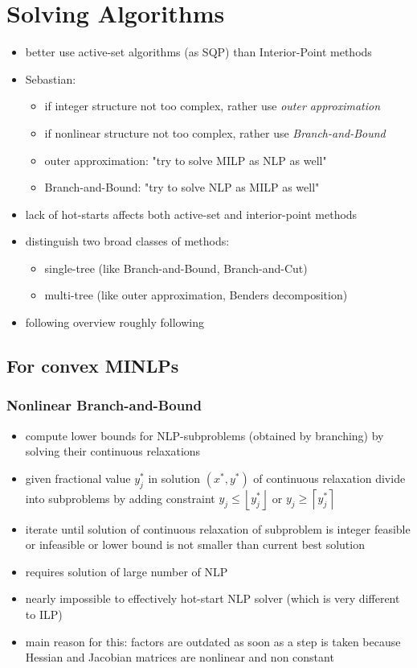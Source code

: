 \documentclass{article}
\begin{document}
\section{Solving Algorithms}
\begin{itemize}
\item better use active-set algorithms (as SQP) than Interior-Point methods
\item Sebastian: 
\begin{itemize}
\item if integer structure not too complex, rather use \textit{outer approximation}
\item if nonlinear structure not too complex, rather use \textit{Branch-and-Bound}
\item outer approximation: "try to solve MILP as NLP as well"
\item Branch-and-Bound: "try to solve NLP as MILP as well"
\end{itemize}
\item lack of hot-starts affects both active-set and interior-point methods
\item distinguish two broad classes of methods: 
\begin{itemize}
\item single-tree (like Branch-and-Bound, Branch-and-Cut) 
\item multi-tree (like outer approximation, Benders decomposition)
\end{itemize}
\item following overview roughly following \cite{d2013mixed}
\end{itemize}

\subsection{For convex MINLPs}
\subsubsection{Nonlinear Branch-and-Bound}
\begin{itemize}
\item compute lower bounds for NLP-subproblems (obtained by branching) by solving their continuous relaxations
\item given fractional value $y_j^*$ in solution $(x^*,y^*)$ of continuous relaxation divide into subproblems by adding constraint $y_j \leq \left \lfloor{y_j^*}\right \rfloor$ or $y_j \geq \left \lceil{y_j^*}\right \rceil$ 
\item iterate until solution of continuous relaxation of subproblem is integer feasible or infeasible or lower bound is not smaller than current best solution
\item requires solution of large number of NLP
\item nearly impossible to effectively hot-start NLP solver (which is very different to ILP)
\item main reason for this: factors are outdated as soon as a step is taken because Hessian and Jacobian matrices are nonlinear and non constant
\end{itemize}
\end{document}
